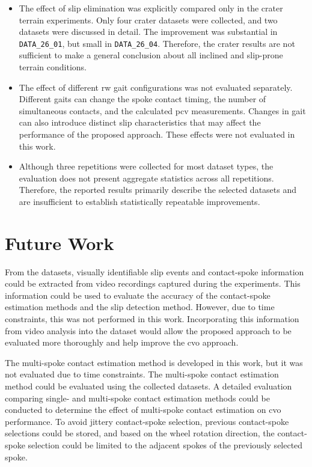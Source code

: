 \documentclass[report.tex]{subfiles}
\begin{document}
\begin{itemize}
    \item The effect of slip elimination was explicitly compared only in the crater terrain experiments. Only four crater datasets were collected, and two datasets were discussed in detail. The improvement was substantial in \texttt{DATA\_26\_01}, but small in \texttt{DATA\_26\_04}. Therefore, the crater results are not sufficient to make a general conclusion about all inclined and slip-prone terrain conditions. 

    \item The effect of different \gls{rw} gait configurations was not evaluated separately. Different gaits can change the spoke contact timing, the number of simultaneous contacts, and the calculated \gls{pcv} measurements. Changes in gait can also introduce distinct slip characteristics that may affect the performance of the proposed approach. These effects were not evaluated in this work. 
    
    \item Although three repetitions were collected for most dataset types, the evaluation does not present aggregate statistics across all repetitions. Therefore, the reported results primarily describe the selected datasets and are insufficient to establish statistically repeatable improvements.

    \end{itemize}

    \section{Future Work}
    
    \label{sec:futureWork}
    
    From the datasets, visually identifiable slip events and contact-spoke information could be extracted from video recordings captured during the experiments. This information could be used to evaluate the accuracy of the contact-spoke estimation methods and the slip detection method. However, due to time constraints, this was not performed in this work. Incorporating this information from video analysis into the dataset would allow the proposed approach to be evaluated more thoroughly and help improve the \gls{cvo} approach.
    
    The multi-spoke contact estimation method is developed in this work, but it was not evaluated due to time constraints. The multi-spoke contact estimation method could be evaluated using the collected datasets. A detailed evaluation comparing single- and multi-spoke contact estimation methods could be conducted to determine the effect of multi-spoke contact estimation on \gls{cvo} performance. To avoid jittery contact-spoke selection, previous contact-spoke selections could be stored, and based on the wheel rotation direction, the contact-spoke selection could be limited to the adjacent spokes of the previously selected spoke. 
\end{document}
